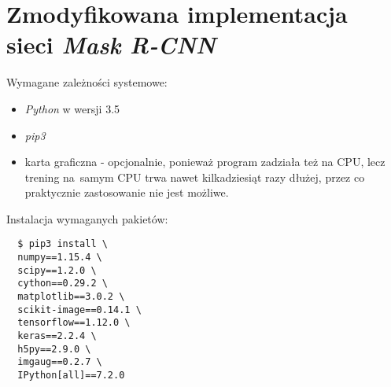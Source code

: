 \section*{Zmodyfikowana implementacja sieci \textit{Mask R-CNN}}

Wymagane zależności systemowe:

\begin{itemize}
  \item \textit{Python} \cite{python} w wersji 3.5
  \item \textit{pip3} \cite{pip}
  \item karta graficzna - opcjonalnie, ponieważ program zadziała też na CPU, lecz trening na~samym CPU trwa nawet kilkadziesiąt razy dłużej, przez co praktycznie zastosowanie nie jest możliwe.
\end{itemize}

Instalacja wymaganych pakietów:

\begin{verbatim}
  $ pip3 install \
  numpy==1.15.4 \
  scipy==1.2.0 \
  cython==0.29.2 \
  matplotlib==3.0.2 \
  scikit-image==0.14.1 \
  tensorflow==1.12.0 \
  keras==2.2.4 \
  h5py==2.9.0 \
  imgaug==0.2.7 \
  IPython[all]==7.2.0
\end{verbatim}